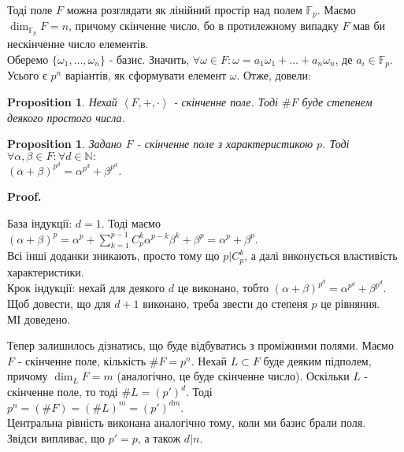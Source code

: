 \documentclass[a4paper, 14pt]{extarticle}
\makeatletter
\theoremstyle{theoremdd}
\theoremstyle{theoremdd}
\theoremstyle{theoremdd}
\theoremstyle{theoremdd}
\theoremstyle{theoremdd}
\newtheorem{proposition}[theorem]{Proposition}
\theoremstyle{theoremdd}
\theoremstyle{theoremdd}
\theoremstyle{theoremdd}
\def\qed{$\blacksquare$}
\renewenvironment{proof}[1][Proof.\\]{\par
\pushQED{\hfill \qed}%
\normalfont \topsep6\p@\@plus6\p@\relax
\trivlist
\item\relax
{\bfseries
#1\@addpunct{.}}\hspace\labelsep\ignorespaces
}{%
\popQED\endtrivlist\@endpefalse
}
\makeatother
\begin{document}
Тоді поле $F$ можна розглядати як лінійний простір над полем $\mathbb{F}_p$.  Маємо $\dim_{\mathbb{F}_p} F = n$, причому скінченне число, бо в протилежному випадку $F$ мав би нескінченне число елементів.\\
Оберемо $\{\omega_1,\dots,\omega_n\}$ - базис. Значить, $\forall \omega \in F: \omega = a_1 \omega_1 + \dots + a_n \omega_n$, де $a_i \in \mathbb{F}_p$. Усього є $p^n$ варіантів, як сформувати елемент $\omega$. Отже, довели:

\begin{proposition}
Нехай $\left<F,+,\cdot\right>$ - скінченне поле. Тоді $\# F$ буде степенем деякого простого числа.
\end{proposition}

\begin{proposition}
Задано $F$ - скінченне поле з характеристикою $p$. Тоді $\forall \alpha,\beta \in F: \forall d \in \mathbb{N}:$\\
$(\alpha + \beta)^{p^d} = \alpha^{p^d} + \beta^{p^d}$.
\end{proposition}

\begin{proof}
База індукції: $d = 1$. Тоді маємо\\
$(\alpha+\beta)^p = \alpha^p + \displaystyle\sum_{k=1}^{p-1} C_p^k \alpha^{p-k} \beta^{k} + \beta^p = \alpha^p + \beta^p$.\\
Всі інші доданки зникають, просто тому що $p | C_p^k$, а далі виконується властивість характеристики.\\
Крок індукції: нехай для деякого $d$ це виконано, тобто $(\alpha + \beta)^{p^d} = \alpha^{p^d} + \beta^{p^d}$. Щоб довести, що для $d+1$ виконано, треба звести до степеня $p$ це рівняння.\\
\iffalse
$(\alpha+\beta)^{p^{d+1}} = (\alpha^{p^d} + \beta^{p^d})^p = (\alpha^{p^d})^p + (\beta^{p^d})^p = \alpha^{p^{d+1}} + \beta^{p^{d+1}}$.
\fi
МІ доведено.
\end{proof}

Тепер залишилось дізнатись, що буде відбуватись з проміжними полями.
Маємо $F$ - скінченне поле, кількість $\# F = p^n$. Нехай $L \subset F$ буде деяким підполем, причому $\dim_L F = m$ (аналогічно, це буде скінченне число). Оскільки $L$ - скінченне поле, то тоді $\# L = (p')^d$. Тоді\\
$p^n = (\# F) = (\# L)^m = (p')^{dm}$.\\
Центральна рівність виконана аналогічно тому, коли ми базис брали поля.\\
Звідси випливає, що $p'=p$, а також $d | n$.
\end{document}
